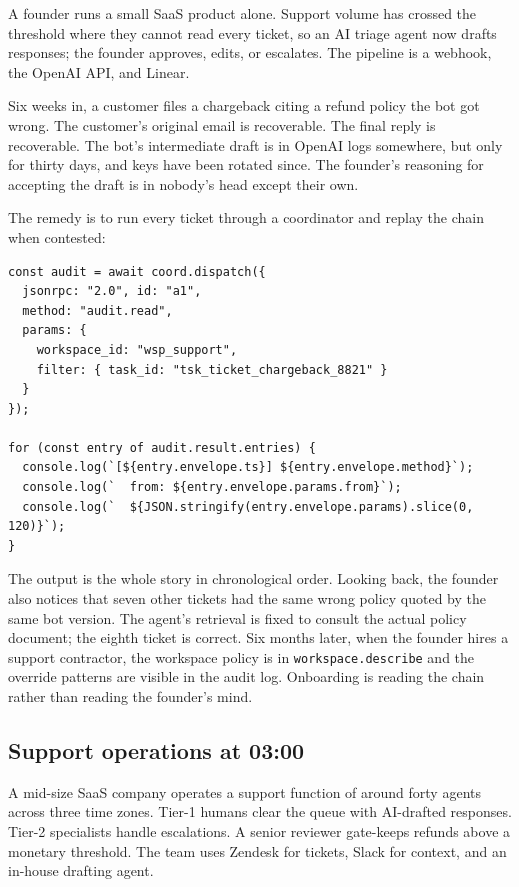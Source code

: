 \documentclass[11pt]{article}
\begin{document}
A founder runs a small SaaS product alone. Support volume has crossed the threshold where they cannot read every ticket, so an AI triage agent now drafts responses; the founder approves, edits, or escalates. The pipeline is a webhook, the OpenAI API, and Linear.

Six weeks in, a customer files a chargeback citing a refund policy the bot got wrong. The customer's original email is recoverable. The final reply is recoverable. The bot's intermediate draft is in OpenAI logs somewhere, but only for thirty days, and keys have been rotated since. The founder's reasoning for accepting the draft is in nobody's head except their own.

The remedy is to run every ticket through a coordinator and replay the chain when contested:

\begin{lstlisting}[caption={Audit-read query for a disputed ticket.},label={lst:case3-replay}]
const audit = await coord.dispatch({
  jsonrpc: "2.0", id: "a1",
  method: "audit.read",
  params: {
    workspace_id: "wsp_support",
    filter: { task_id: "tsk_ticket_chargeback_8821" }
  }
});

for (const entry of audit.result.entries) {
  console.log(`[${entry.envelope.ts}] ${entry.envelope.method}`);
  console.log(`  from: ${entry.envelope.params.from}`);
  console.log(`  ${JSON.stringify(entry.envelope.params).slice(0, 120)}`);
}
\end{lstlisting}

The output is the whole story in chronological order. Looking back, the founder also notices that seven other tickets had the same wrong policy quoted by the same bot version. The agent's retrieval is fixed to consult the actual policy document; the eighth ticket is correct. Six months later, when the founder hires a support contractor, the workspace policy is in \texttt{workspace.describe} and the override patterns are visible in the audit log. Onboarding is reading the chain rather than reading the founder's mind.

\subsection{Support operations at 03:00}

A mid-size SaaS company operates a support function of around forty agents across three time zones. Tier-1 humans clear the queue with AI-drafted responses. Tier-2 specialists handle escalations. A senior reviewer gate-keeps refunds above a monetary threshold. The team uses Zendesk for tickets, Slack for context, and an in-house drafting agent.
\end{document}
